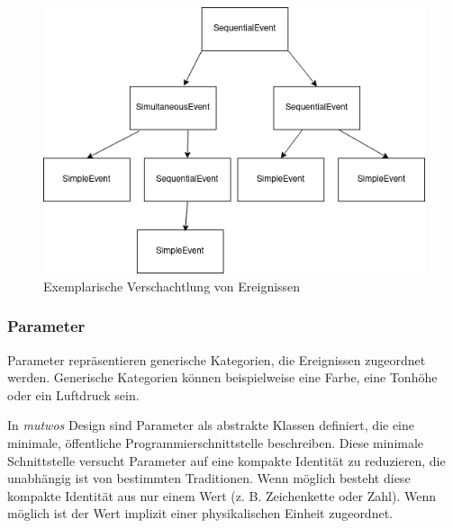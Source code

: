 \documentclass[12pt,a4paper,ngerman]{article}
\begin{document}
\begin{figure}[h!]
    \begin{center}
        \includegraphics[scale=0.5]{pictures/nested_event.png}

        \caption{Exemplarische Verschachtlung von Ereignissen}
    \end{center}
\end{figure}


\subsubsection{Parameter}

Parameter repräsentieren generische Kategorien, die Ereignissen zugeordnet werden.
Generische Kategorien können beispielweise eine Farbe, eine Tonhöhe oder ein Luftdruck sein.

\bigskip

In \emph{mutwos} Design sind Parameter als abstrakte Klassen definiert, die eine minimale, öffentliche Programmierschnittstelle beschreiben.
Diese minimale Schnittstelle versucht Parameter auf eine kompakte Identität zu reduzieren, die unabhängig ist von bestimmten Traditionen.
Wenn möglich besteht diese kompakte Identität aus nur einem Wert (z. B. Zeichenkette oder Zahl).
Wenn möglich ist der Wert implizit einer physikalischen Einheit zugeordnet.
\end{document}
